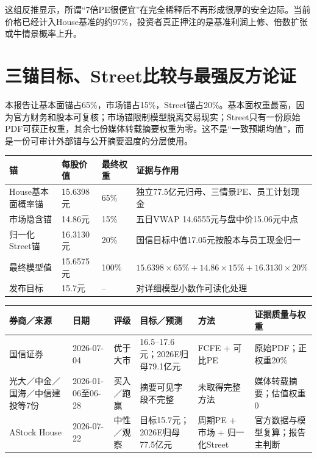 这组反推显示，所谓“7倍PE很便宜”在完全稀释后不再形成很厚的安全边际。当前价格已经计入House基准的约97\%，投资者真正押注的是基准利润上修、倍数扩张或牛情景概率上升。

\section{三锚目标、Street比较与最强反方论证}

本报告让基本面锚占65\%，市场锚占15\%，Street锚占20\%。基本面权重最高，因为官方财务和股本可复核；市场锚限制模型脱离交易现实；Street只有一份原始PDF可获正权重，其余七份媒体转载摘要权重为零。这不是“一致预期均值”，而是一份可审计外部锚与公开摘要温度的分层使用。

\begin{exhibitbox}[市场情绪锚与最终权重]
\noindent\begin{tabularx}{\textwidth}{L{3.2cm}R{1.8cm}R{1.6cm}X}
\toprule
\textbf{锚} & \textbf{每股价值} & \textbf{最终权重} & \textbf{证据与作用} \\
\midrule
House基本面概率锚 & 15.6398元 & 65\% & 独立77.5亿元归母、三情景PE、员工计划现金 \\
市场隐含锚 & 14.86元 & 15\% & 五日VWAP 14.6555元与盘中价15.06元中点 \\
归一化Street锚 & 16.3130元 & 20\% & 国信目标中值17.05元按股本与员工现金归一 \\
最终模型值 & 15.6575元 & 100\% & $15.6398\times65\%+14.86\times15\%+16.3130\times20\%$ \\
发布目标 & 15.7元 & -- & 对详细模型小数作可读化处理 \\
\bottomrule
\end{tabularx}
\end{exhibitbox}

\begin{exhibitbox}[公开Street比较与证据质量]
\small
\noindent\begin{tabularx}{\textwidth}{L{2.0cm}L{1.7cm}L{1.5cm}L{2.0cm}L{2.4cm}X}
\toprule
\textbf{券商／来源} & \textbf{日期} & \textbf{评级} & \textbf{目标／预测} & \textbf{方法} & \textbf{证据质量与权重} \\
\midrule
国信证券 & 2026-07-04 & 优于大市 & 16.5--17.6元；2026E归母79.1亿元 & FCFE + 可比PE & 原始PDF；正权重20\% \\
光大／中金／国海／中信建投等7份 & 2026-01-06至06-28 & 买入／跑赢 & 摘要可见字段不完整 & 未取得完整方法 & 媒体转载摘要；估值权重0 \\
AStock House & 2026-07-22 & 中性／观察 & 目标15.7元；2026E归母77.5亿元 & 周期PE + 市场 + 归一化Street & 官方数据与模型复算；报告主判断 \\
\bottomrule
\end{tabularx}
\end{exhibitbox}

